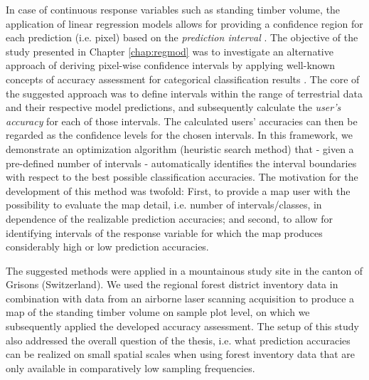 In case of continuous response variables such as standing timber volume, the application of linear regression models allows for providing a confidence region for each prediction (i.e. pixel) based on the \textit{prediction interval} \citep[pp.136--139]{fahrmeir2013}. The objective of the study presented in Chapter \ref{chap:regmod} was to investigate an alternative approach of deriving pixel-wise confidence intervals by applying well-known concepts of accuracy assessment for categorical classification results \citep{congalton2008}. The core of the suggested approach was to define intervals within the range of terrestrial data and their respective model predictions, and subsequently calculate the \textit{user's accuracy} for each of those intervals. The calculated users' accuracies can then be regarded as the confidence levels for the chosen intervals. In this framework, we demonstrate an optimization algorithm (heuristic search method) that - given a pre-defined number of intervals - automatically identifies the interval boundaries with respect to the best possible classification accuracies. The motivation for the development of this method was twofold: First, to provide a map user with the possibility to evaluate the map detail, i.e. number of intervals/classes, in dependence of the realizable prediction accuracies; and second, to allow for identifying intervals of the response variable for which the map produces considerably high or low prediction accuracies.\par 

The suggested methods were applied in a mountainous study site in the canton of Grisons (Switzerland). We used the regional forest district inventory data in combination with data from an airborne laser scanning acquisition to produce a map of the standing timber volume on sample plot level, on which we subsequently applied the developed accuracy assessment. The setup of this study also addressed the overall question of the thesis, i.e. what prediction accuracies can be realized on small spatial scales when using forest inventory data that are only available in comparatively low sampling frequencies.


